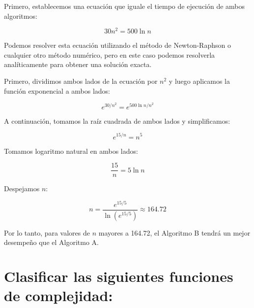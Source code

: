 Primero, establecemos una ecuación que iguale el tiempo de ejecución de ambos algoritmos:

\begin{equation}
	30n^2 = 500 \ln n
\end{equation}

Podemos resolver esta ecuación utilizando el método de Newton-Raphson o cualquier otro método numérico, 
pero en este caso podemos resolverla analíticamente para obtener una solución exacta.

Primero, dividimos ambos lados de la ecuación por $n^2$ y luego aplicamos la función exponencial a ambos lados:

\begin{equation}
	e^{30/n^2} = e^{500 \ln n/n^2}
\end{equation}

A continuación, tomamos la raíz cuadrada de ambos lados y simplificamos:

\begin{equation}
	e^{15/n} = n^5
\end{equation}

Tomamos logaritmo natural en ambos lados:

\begin{equation}
	\frac{15}{n} = 5 \ln n
\end{equation}

Despejamos $n$:

\begin{equation}
	n = \frac{e^{15/5}}{\ln(e^{15/5})} \approx 164.72
\end{equation}

Por lo tanto, para valores de $n$ mayores a 164.72,
el Algoritmo B tendrá un mejor desempeño que el Algoritmo A.

\section{Clasificar las siguientes funciones de complejidad:}

